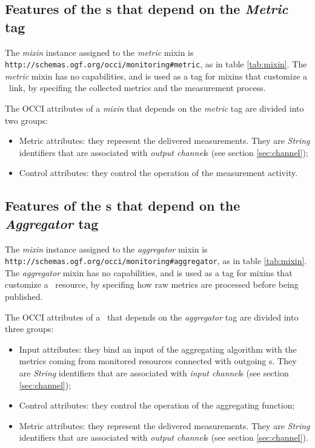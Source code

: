 \documentclass[10pt,a4paper]{article}
\begin{document}
\subsection{Features of the \mi s that depend on the {\em Metric} tag \label{sec:metric}}

The {\em mixin} instance assigned to the {\em metric} mixin is {\tt http://schemas.ogf.org/occi/monitoring\#metric}, as in table \ref{tab:mixin}. The {\em metric} mixin has no capabilities, and is used as a tag for mixins that customize a \coll\ link, by specifing the collected metrics and the measurement process.

The OCCI attributes of a {\em mixin} that depends on the {\em metric} tag are divided into two groups:
\begin{itemize}

\item Metric attributes: they represent the delivered measurements. They are {\em String} identifiers that are associated with {\em output channel}s (see section \ref{sec:channel});
\item Control attributes: they control the operation of the measurement activity.
\end{itemize}

\subsection{Features of the \mi s that depend on the {\em Aggregator} tag \label{sec:aggregator}}

The {\em mixin} instance assigned to the {\em aggregator} mixin is {\tt http://schemas.ogf.org/occi/monitoring\#aggregator}, as in table \ref{tab:mixin}. The {\em aggregator} mixin has no capabilities, and is used as a tag for mixins that customize a \sens\ resource, by specifing how raw metrics are processed before being published.

The OCCI attributes of a \mi\ that depends on the {\em aggregator} tag are divided into three groups:

\begin{itemize}
\item Input attributes: they bind an input of the aggregating algorithm with the metrics coming from monitored resources connected with outgoing \coll s. They are {\em String} identifiers that are associated with {\em input channel}s (see section \ref{sec:channel});
\item Control attributes: they control the operation of the aggregating function;
\item Metric attributes: they represent the delivered measurements. They are {\em String} identifiers that are associated with {\em output channel}s (see section \ref{sec:channel}).
\end{itemize}
\end{document}
